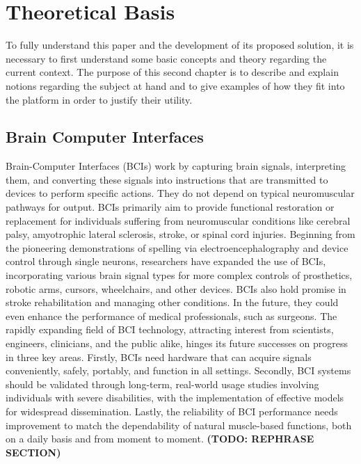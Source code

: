 
\chapter{Theoretical Basis}\label{cap:theory}
\hspace{\parindent} To fully understand this paper and the development of its proposed solution, it is necessary to first understand some basic concepts and theory regarding the current context. The purpose of this second chapter is to describe and explain notions regarding the subject at hand and to give examples of how they fit into the platform in order to justify their utility.


\section{Brain Computer Interfaces}\label{sect:bcis}
\hspace{\parindent}Brain-Computer Interfaces (BCIs) work by capturing brain signals, interpreting them, and converting these signals into instructions that are transmitted to devices to perform specific actions. They do not depend on typical neuromuscular pathways for output. BCIs primarily aim to provide functional restoration or replacement for individuals suffering from neuromuscular conditions like cerebral palsy, amyotrophic lateral sclerosis, stroke, or spinal cord injuries. Beginning from the pioneering demonstrations of spelling via electroencephalography and device control through single neurons, researchers have expanded the use of BCIs, incorporating various brain signal types for more complex controls of prosthetics, robotic arms, cursors, wheelchairs, and other devices. BCIs also hold promise in stroke rehabilitation and managing other conditions. In the future, they could even enhance the performance of medical professionals, such as surgeons. The rapidly expanding field of BCI technology, attracting interest from scientists, engineers, clinicians, and the public alike, hinges its future successes on progress in three key areas. Firstly, BCIs need hardware that can acquire signals conveniently, safely, portably, and function in all settings. Secondly, BCI systems should be validated through long-term, real-world usage studies involving individuals with severe disabilities, with the implementation of effective models for widespread dissemination. Lastly, the reliability of BCI performance needs improvement to match the dependability of natural muscle-based functions, both on a daily basis and from moment to moment. {\bfseries(TODO: REPHRASE SECTION)}

